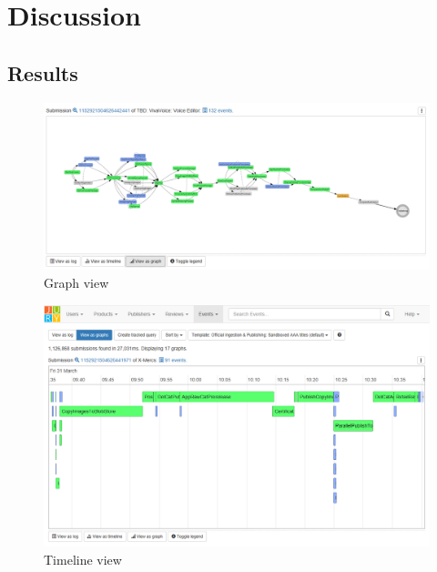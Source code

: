 
\clearpage
\section{Discussion}
\label{sec:discussion}

\subsection{Results}




\begin{figure}[htb]
\centering \includegraphics[width=\linewidth]{gfx/graph.png}
\caption{Graph view \label{fig:graph}}
\end{figure}

\begin{figure}[htb]
\centering \includegraphics[width=\linewidth]{gfx/timeline.png}
\caption{Timeline view \label{fig:timeline}}
\end{figure}

